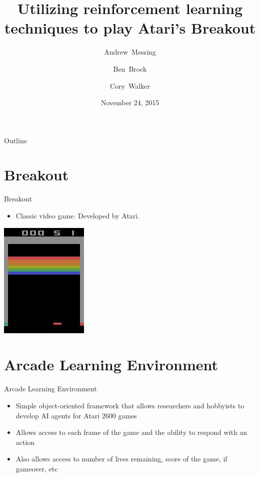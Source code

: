 \documentclass{beamer}
\title{Utilizing reinforcement learning techniques to play Atari's Breakout}
\author{Andrew~Messing \and Ben~Brock \and Cory~Walker}
\date{November 24, 2015}
\begin{document}
\begin{frame}
  \titlepage
\end{frame}

\begin{frame}{Outline}
  \tableofcontents
\end{frame}


\section{Breakout}
\begin{frame}{Breakout}
  \begin{itemize}
    \item Classic video game.  Developed by Atari.
  \end{itemize}
  \begin{center}
  \includegraphics{tmp.jpg}
  \end{center}
\end{frame}

\section{Arcade Learning Environment}

\begin{frame}{Arcade Learning Environment}
  \begin{itemize}
    \item Simple object-oriented framework that allows researchers and hobbyists to develop AI agents for Atari 2600 games
    \item Allows access to each frame of the game and the ability to respond with an action
    \item Also allows access to number of lives remaining, score of the game, if gameover, etc
  \end{itemize}
\end{frame}
\end{document}
